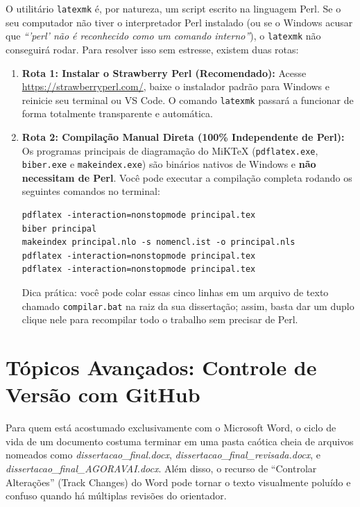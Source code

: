 \documentclass[12pt, a4paper]{article}
\begin{document}
\begin{atencao}
O utilitário \texttt{latexmk} é, por natureza, um script escrito na linguagem Perl. Se o seu computador não tiver o interpretador Perl instalado (ou se o Windows acusar que \textit{``'perl' não é reconhecido como um comando interno''}), o \texttt{latexmk} não conseguirá rodar. Para resolver isso sem estresse, existem duas rotas:

\begin{enumerate}
    \item \textbf{Rota 1: Instalar o Strawberry Perl (Recomendado):} Acesse \url{https://strawberryperl.com/}, baixe o instalador padrão para Windows e reinicie seu terminal ou VS Code. O comando \texttt{latexmk} passará a funcionar de forma totalmente transparente e automática.
    \item \textbf{Rota 2: Compilação Manual Direta (100\% Independente de Perl):} Os programas principais de diagramação do MiKTeX (\texttt{pdflatex.exe}, \texttt{biber.exe} e \texttt{makeindex.exe}) são binários nativos de Windows e \textbf{não necessitam de Perl}. Você pode executar a compilação completa rodando os seguintes comandos no terminal:
\begin{verbatim}
pdflatex -interaction=nonstopmode principal.tex
biber principal
makeindex principal.nlo -s nomencl.ist -o principal.nls
pdflatex -interaction=nonstopmode principal.tex
pdflatex -interaction=nonstopmode principal.tex
\end{verbatim}
    Dica prática: você pode colar essas cinco linhas em um arquivo de texto chamado \texttt{compilar.bat} na raiz da sua dissertação; assim, basta dar um duplo clique nele para recompilar todo o trabalho sem precisar de Perl.
\end{enumerate}
\end{atencao}

\section{Tópicos Avançados: Controle de Versão com GitHub}

Para quem está acostumado exclusivamente com o Microsoft Word, o ciclo de vida de um documento costuma terminar em uma pasta caótica cheia de arquivos nomeados como \textit{dissertacao\_final.docx}, \textit{dissertacao\_final\_revisada.docx}, e \textit{dissertacao\_final\_AGORAVAI.docx}. Além disso, o recurso de ``Controlar Alterações'' (Track Changes) do Word pode tornar o texto visualmente poluído e confuso quando há múltiplas revisões do orientador.
\end{document}
